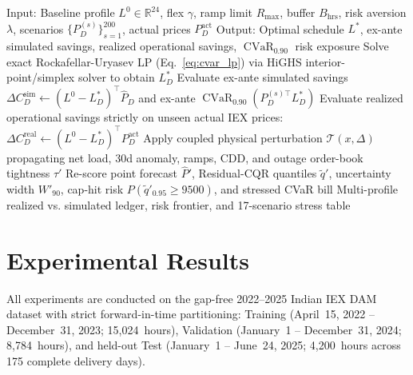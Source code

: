 \documentclass[journal,10pt,twocolumn]{IEEEtran}
\begin{document}
\begin{algorithm*}[!t]
\caption{Stochastic CVaR-Constrained Procurement Optimization and Multi-Disturbance Risk Stress Testing}
\label{alg:stoch_opt}
\footnotesize
\begin{algorithmic}[1]
\State Input: Baseline profile $L^0 \in \mathbb{R}^{24}$, flex $\gamma$, ramp limit $R_{\max}$, buffer $B_{\text{hrs}}$, risk aversion $\lambda$, scenarios $\{P_D^{(s)}\}_{s=1}^{200}$, actual prices $P_D^{\text{act}}$
\State Output: Optimal schedule $L^*$, ex-ante simulated savings, realized operational savings, $\operatorname{CVaR}_{0.90}$ risk exposure
    \State Solve exact Rockafellar-Uryasev LP (Eq.~\ref{eq:cvar_lp}) via HiGHS interior-point/simplex solver to obtain $L_D^*$
    \State Evaluate ex-ante simulated savings $\Delta C_D^{\text{sim}} \gets (L^0 - L_D^*)^\top \hat{P}_D$ and ex-ante $\operatorname{CVaR}_{0.90}(P_D^{(s)\top} L_D^*)$
    \State Evaluate realized operational savings strictly on unseen actual IEX prices: $\Delta C_D^{\text{real}} \gets (L^0 - L_D^*)^\top P_D^{\text{act}}$
\EndFor
{}
    \State Apply coupled physical perturbation $\mathcal{T}(x, \Delta)$ propagating net load, 30d anomaly, ramps, CDD, and outage order-book tightness $\tau'$
    \State Re-score point forecast $\hat{P}'$, Residual-CQR quantiles $\tilde{q}'$, uncertainty width $W'_{90}$, cap-hit risk $P(\tilde{q}'_{0.95}\ge 9500)$, and stressed CVaR bill
\EndFor
\State \Return Multi-profile realized vs. simulated ledger, risk frontier, and 17-scenario stress table
\end{algorithmic}
\end{algorithm*}

\section{Experimental Results}
All experiments are conducted on the gap-free 2022--2025 Indian IEX DAM dataset with strict forward-in-time partitioning: Training (April~15, 2022 -- December~31, 2023; 15,024~hours), Validation (January~1 -- December~31, 2024; 8,784~hours), and held-out Test (January~1 -- June~24, 2025; 4,200~hours across 175 complete delivery days).
\end{document}
